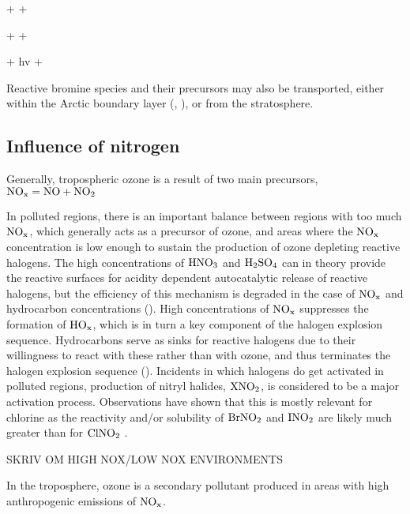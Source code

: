 \begin{reaction}
     +   + 
    \label{R:10}
\end{reaction} 
\begin{reaction}
     +   + 
    \label{R:11}
\end{reaction}
\begin{reaction}
     + hv  + 
    \label{R:12}
\end{reaction}

\medskip

Reactive bromine species and their precursors may also be transported, either within the Arctic boundary layer (\cite{Luo2018}, \cite{Schmidt}), or from the stratosphere. 


\subsection{Influence of nitrogen}


Generally, tropospheric ozone is a result of two main precursors, $\mathrm{NO_x} = \mathrm{NO} + \mathrm{NO_2}$

In polluted regions, there is an important balance between regions with too much $\mathrm{NO_x}$, which generally acts as a precursor of ozone, and areas where the $\mathrm{NO_x}$ concentration is low enough to sustain the production of ozone depleting reactive halogens. The high concentrations of $\mathrm{HNO_3}$ and $\mathrm{H_2SO_4}$ can in theory provide the reactive surfaces for acidity dependent autocatalytic release of reactive halogens, but the efficiency of this mechanism is degraded in the case of $\mathrm{NO_x}$ and hydrocarbon concentrations (\cite{Simpson2015}). High concentrations of $\mathrm{NO_x}$ suppresses the formation of $\mathrm{HO_x}$, which is in turn a key component of the halogen explosion sequence. Hydrocarbons serve as sinks for reactive halogens due to their willingness to react with these rather than with ozone, and thus terminates the halogen explosion sequence (\cite{Simpson2015}). Incidents in which halogens do get activated in polluted regions, production of nitryl halides, $\mathrm{XNO_2}$, is considered to be a major activation process. Observations have shown that this is mostly relevant for chlorine as the reactivity and/or solubility of $\mathrm{BrNO_2}$ and $\mathrm{INO_2}$ are likely much greater than for $\mathrm{ClNO_2}$ \cite{Simpson2015}. 

\medskip





\cite{SeinfeldSpyros} SKRIV OM HIGH NOX/LOW NOX ENVIRONMENTS

In the troposphere, ozone is a secondary pollutant produced in areas with high anthropogenic emissions of $\mathrm{NO_x}$. 